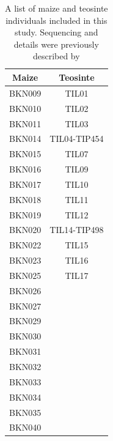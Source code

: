 \begin{table}[h]  
  \begin{center}
  \begin{tabular}{c|c}
    \bf Maize & \bf Teosinte \\ \hline \hline
    BKN009 &  TIL01 \\
    BKN010 & TIL02 \\
    BKN011 & TIL03 \\
    BKN014 & TIL04-TIP454 \\
    BKN015 & TIL07 \\
    BKN016 & TIL09 \\
    BKN017 & TIL10 \\
    BKN018 & TIL11 \\
    BKN019 & TIL12 \\
    BKN020 & TIL14-TIP498 \\
    BKN022 & TIL15 \\
    BKN023 & TIL16 \\
    BKN025 & TIL17 \\
    BKN026 & \\
    BKN027 & \\
    BKN029 & \\
    BKN030 & \\
    BKN031 & \\
    BKN032 & \\
    BKN033 & \\
    BKN034 & \\
    BKN035 & \\
    BKN040 & \\ \hline
  \end{tabular}
  \end{center}
  \caption{A list of maize and teosinte individuals included in this study. Sequencing and details were previously described by \cite{chia2012}   } \label{sTab:list}
\end{table}
\clearpage


